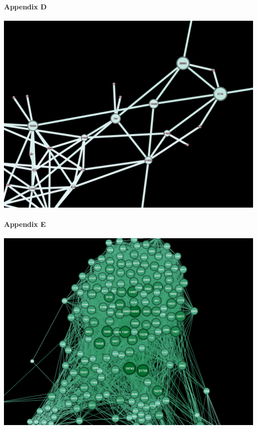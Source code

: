 \documentclass[11pt,twocolumn]{article}
\begin{document}
\paragraph{Appendix D\newline\newline\newline\newline\newline}
\includegraphics[scale=0.22]{betweennesscentraility_com.png}
\paragraph{{\newline\newline}Appendix E\newline\newline\newline\newline\newline}
\includegraphics[scale=0.22]{closennesscentraility_gov.png}
\end{document}
